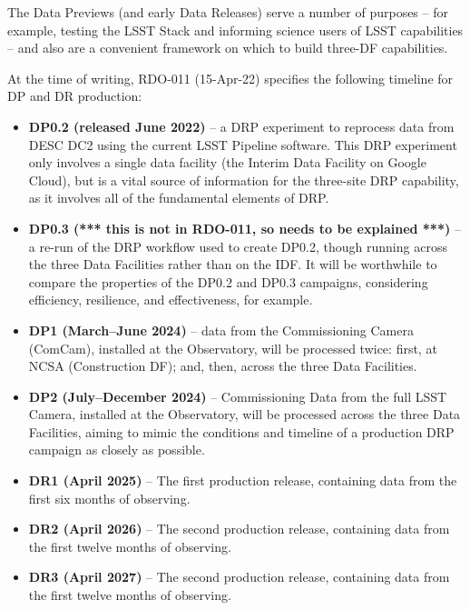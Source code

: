 The Data Previews (and early Data Releases) serve a number of purposes -- for example, testing the LSST Stack and informing science users of LSST capabilities -- and also are a convenient framework on which to build three-DF capabilities.

At the time of writing, RDO-011 (15-Apr-22) specifies the following timeline for DP and DR production:

\begin{itemize}

\item {\bf DP0.2 (released June 2022)} -- a DRP experiment to reprocess data from DESC DC2 using the current LSST Pipeline software. This DRP experiment only involves a single data facility (the Interim Data Facility on Google Cloud), but is a vital source of information for the three-site DRP capability, as it involves all of the fundamental elements of DRP.
  
\item {\bf DP0.3 (*** this is not in RDO-011, so needs to be explained ***)} -- a re-run of the DRP workflow used to create DP0.2, though running across the three Data Facilities rather than on the IDF. It will be worthwhile to compare the properties of the DP0.2 and DP0.3 campaigns, considering efficiency, resilience, and effectiveness, for example.
  
\item {\bf DP1 (March--June 2024)} -- data from the Commissioning Camera (ComCam), installed at the Observatory, will be processed twice: first, at NCSA (Construction DF); and, then, across the three Data Facilities.

\item {\bf DP2 (July--December 2024)} – Commissioning Data from the full LSST Camera, installed at the Observatory, will be processed across the three Data Facilities, aiming to mimic the conditions and timeline of a production DRP campaign as closely as possible.

\item {\bf DR1 (April 2025)} -- The first production release, containing data from the first six months of observing.
  
\item {\bf DR2 (April 2026)} -- The second production release, containing data from the first twelve months of observing.
  
\item {\bf DR3 (April 2027)} -- The second production release, containing data from the first twelve months of observing.
  
\end{itemize}

